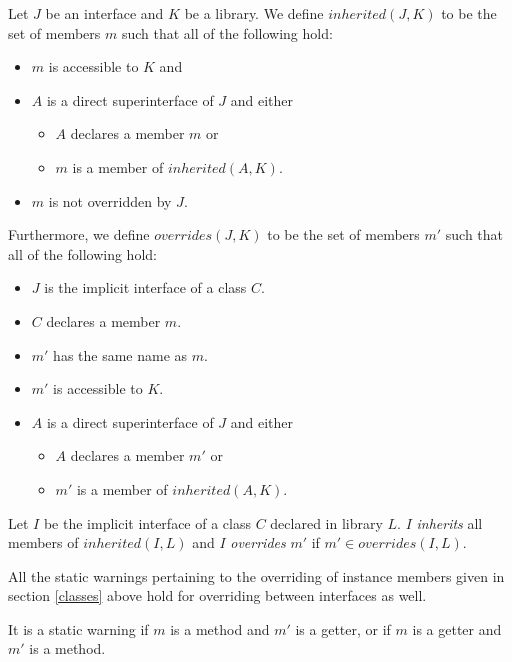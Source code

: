 \documentclass{article}
\begin{document}
\LMHash{}
Let $J$ be an interface and $K$ be a library.
We define $inherited(J, K)$ to be the set of members $m$ such that all of the following hold:
\begin{itemize}
\item $m$ is accessible to $K$ and
\item $A$ is a direct superinterface of $J$ and either
  \begin{itemize}
  \item $A$ declares a member $m$ or
  \item $m$ is a member of $inherited(A, K)$.
  \end{itemize}
\item $m$ is not overridden by $J$.
\end{itemize}

\LMHash{}
Furthermore, we define $overrides(J, K)$ to be the set of members $m'$ such that all of the following hold:
\begin{itemize}
\item $J$ is the implicit interface of a class $C$.
\item $C$ declares a member $m$.
\item $m'$ has the same name as $m$.
\item $m'$ is accessible to $K$.
\item $A$ is a direct superinterface of $J$ and either
  \begin{itemize}
  \item $A$ declares a member $m'$ or
  \item $m'$ is a member of $inherited(A, K)$.
  \end{itemize}
\end{itemize}

\LMHash{}
Let $I$ be the implicit interface of a class $C$ declared in library $L$.
$I$ {\em inherits} all members of $inherited(I, L)$ and $I$ {\em overrides} $m'$ if $m' \in overrides(I, L)$.

\LMHash{}
All the static warnings pertaining to the overriding of instance members given in section \ref{classes} above hold for overriding between interfaces as well.

\LMHash{}
It is a static warning if $m$ is a method and $m'$ is a getter, or if $m$ is a getter and $m'$ is a method.


\end{document}
